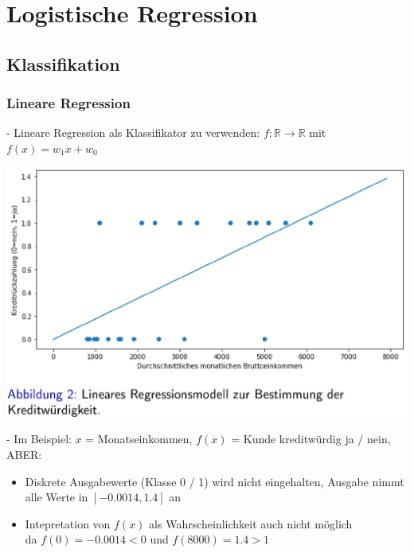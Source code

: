 \documentclass{report}
\begin{document}
\chapter{Logistische Regression}
\section{Klassifikation}
\subsection{Lineare Regression}
- Lineare Regression als Klassifikator zu verwenden: $f: \mathbb{R} \rightarrow \mathbb{R}$
mit $f(x) = w_1x + w_0$
\begin{center}
  \includegraphics[scale=.215]{ml03_1}
\end{center}
- Im Beispiel: $x$ = Monatseinkommen, $f(x)$ = Kunde kreditwürdig ja / nein, ABER:\\
\vspace*{-1.25em}
\begin{itemize}
  \item Diskrete Ausgabewerte (Klasse 0 / 1) wird nicht eingehalten, Ausgabe nimmt alle Werte in $[-0.0014, 1.4]$ an
  \item Intepretation von $f(x)$ als Wahrscheinlichkeit auch nicht möglich\\
  da $f(0) = -0.0014 < 0$ und $f(8000) = 1.4 > 1$
\end{itemize}
\end{document}

